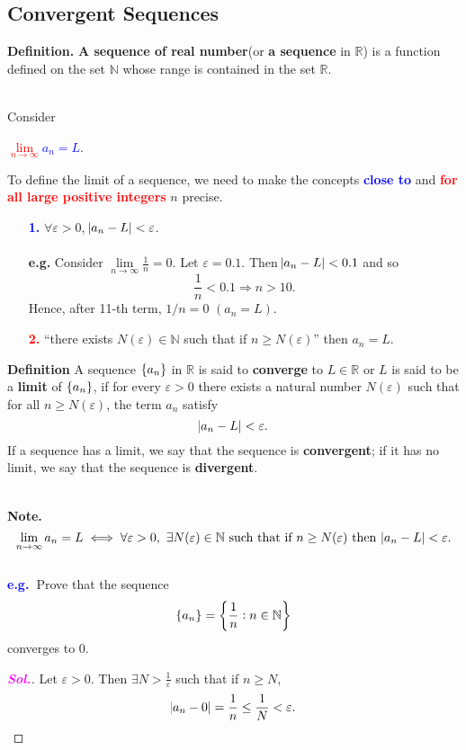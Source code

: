 \documentclass[12pt,a4paper]{article}
\newcommand{\dispsty}{\displaystyle}
\newcommand{\sol}{\textcolor{magenta}{\bf \textit{Sol.}}\quad}
\newcommand{\eg}{\textcolor{blue}{\bf e.g.\ \quad }}
\begin{document}
\subsection{Convergent Sequences}
\begin{tcolorbox}[colback=white]
	\textbf{Definition.} \textbf{A sequence of real number}(or \textbf{a sequence} in $\mathbb{R}$) is a function defined on the set $\mathbb{N}$ whose range is contained in the set $\mathbb{R}$.
\end{tcolorbox}\
\\
Consider \begin{center}
	\textcolor{red}{$\lim\limits_{n\to\infty}$}\textcolor{blue}{$a_n=L$}.
\end{center} To define the limit of a sequence, we need to make the concepts \textcolor{blue}{\bf close to} and \textcolor{red}{\bf for all large positive integers} $n$ precise.\begin{itemize}
	\item[\textcolor{blue}{\bf 1.}] $\forall\varepsilon>0$, $\abs{a_n-L}<\varepsilon$. \\
	\\
	\textbf{e.g.} Consider $\dispsty\lim\limits_{n\to\infty}\frac{1}{n}=0$. Let $\varepsilon=0.1$. Then $\abs{a_n-L}<0.1$ and so \[
	\frac{1}{n}<0.1 \Rightarrow n>10.
	\] Hence, after 11-th term, $1/n=0$ $(a_n=L)$.
	\item[\textcolor{red}{\bf 2.}] ``there exists $N(\varepsilon)\in\mathbb{N}$ such that if $n\geq N(\varepsilon)$'' then $a_n=L$.
\end{itemize}
\begin{tcolorbox}[colback=white]
	\textbf{Definition} A sequence $\set{a_n}$ in $\mathbb{R}$ is said to \textbf{converge} to $L\in\mathbb{R}$ or $L$ is said to be a \textbf{limit} of $\set{a_n}$, if for every $\varepsilon>0$ there exists a natural number $N(\varepsilon)$ such that for all $n\geq N(\varepsilon)$, the term $a_n$ satisfy \[
	\abs{a_n-L}<\varepsilon.
	\] If a sequence has a limit, we say that the sequence is \textbf{convergent}; if it has no limit, we say that the sequence is \textbf{divergent}.
\end{tcolorbox}\
\\
\textbf{Note.} \[
\lim\limits_{n\to\infty}a_n=L\iff\forall\varepsilon>0,\ \exists N(\varepsilon)\in\mathbb{N}\ \text{such that}\ \text{if}\ n\geq N(\varepsilon)\ \text{then}\ \abs{a_n-L}<\varepsilon. 
\]
\\
\eg Prove that the sequence \[
\set{a_n}=\set{\frac{1}{n}:n\in\mathbb{N}}
\] converges to 0.\begin{proof}[\sol]
	Let $\varepsilon>0$. Then $\dispsty\exists N>\frac{1}{\varepsilon}$ such that if $n\geq N$, \[
	\abs{a_n-0}=\frac{1}{n}\leq\frac{1}{N}<\varepsilon.
	\]
\end{proof}
\end{document}
